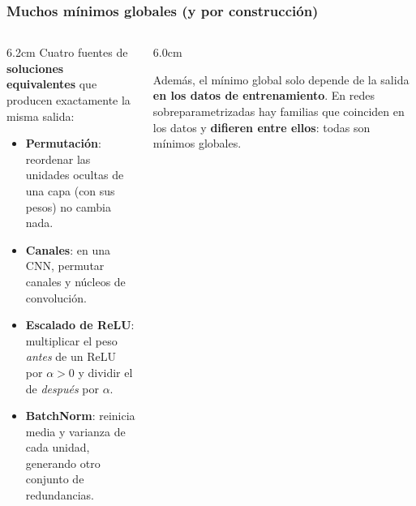 \documentclass[aspectratio=169, 10pt]{beamer}
\begin{document}
\begin{frame}
\frametitle{Muchos mínimos globales (y por construcción)}
\begin{columns}[T]
\begin{column}{6.2cm}
Cuatro fuentes de \textbf{soluciones equivalentes} que producen exactamente la misma salida:
\begin{itemize}
	\item \textbf{Permutaci\'on}: reordenar las unidades ocultas de una capa (con sus pesos) no cambia nada.
	\item \textbf{Canales}: en una CNN, permutar canales y n\'ucleos de convoluci\'on.
	\item \textbf{Escalado de ReLU}: multiplicar el peso \emph{antes} de un ReLU por $\alpha>0$ y dividir el de \emph{despu\'es} por $\alpha$.
	\item \textbf{BatchNorm}: reinicia media y varianza de cada unidad, generando otro conjunto de redundancias.
\end{itemize}
\end{column}
\begin{column}{6.0cm}
\begin{center}
\end{center}
\vspace{0.3em}
\footnotesize
Adem\'as, el m\'inimo global solo depende de la salida \textbf{en los datos de entrenamiento}. En redes sobreparametrizadas hay familias que coinciden en los datos y \textbf{difieren entre ellos}: todas son m\'inimos globales.
\end{column}
\end{columns}
\end{frame}
\end{document}
